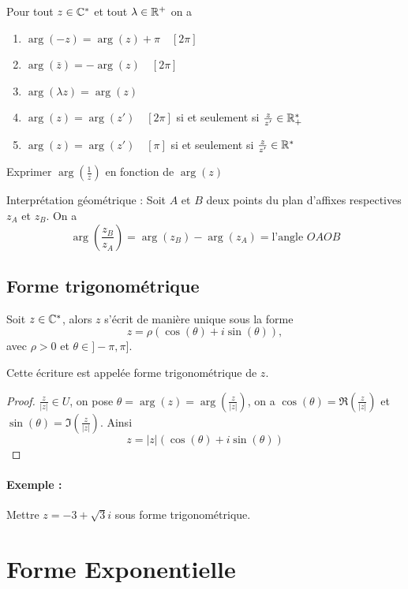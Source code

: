 \documentclass[a4paper, 11pt]{article}
\begin{document}
\begin{prop}
Pour tout $z\in \mathbb{C}^*$ et tout $\lambda \in \mathbb{R}^+$ on a 
\begin{enumerate}
\item $\arg(-z)= \arg(z) +\pi \quad  [2\pi] $
\item $\arg(\bar{z})= -\arg(z) \quad  [2\pi] $
\item $\arg(\lambda z)= \arg(z)  $
\item $\arg(z)= \arg(z') \quad [2\pi]$ si et seulement si $\frac{z}{z'} \in \mathbb{R}^*_+$ 
\item $\arg(z)= \arg(z') \quad [\pi]$ si et seulement si $\frac{z}{z'} \in \mathbb{R}^*$ 
\end{enumerate}

\end{prop}
\begin{exo}
Exprimer $\arg\left( \frac{1}{z}\right) $ en fonction de $\arg(z)$
\end{exo}

Interprétation géométrique : 
Soit $A$ et $B$ deux points du plan d'affixes  respectives $z_A$ et $z_B$. On a 
$$\arg\left( \frac{z_B}{z_A}\right) =\arg(z_B)-\arg(z_A) = \text{l'angle } OA OB$$ 


\subsection{Forme trigonométrique}
\begin{theorem}
Soit $z\in \mathbb{C}^*$, alors $z$ s'écrit de manière unique sous la forme 
$$z = \rho(\cos(\theta) +i \sin(\theta)), $$
avec $\rho>0$ et $\theta \in ]-\pi, \pi]$. 

Cette écriture est appelée forme trigonométrique de $z$.
\end{theorem}

\begin{proof}
$\frac{z}{|z|}\in U$, on pose
$\theta = \arg(z)=\arg(\frac{z}{|z|})$, on a $\cos(\theta) =\Re(\frac{z}{|z|})$ et $\sin(\theta)= \Im(\frac{z}{|z|})$.
Ainsi $$z = |z| (\cos(\theta) +i \sin(\theta))$$
\end{proof}

\paragraph{Exemple :}  Mettre $z= -3+\sqrt{3}i $ sous forme trigonométrique. 





\section{Forme Exponentielle}
\end{document}

